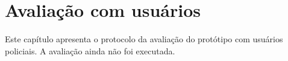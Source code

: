 \chapter{Avaliação com usuários}
\label{cap:avaliacao}

Este capítulo apresenta o protocolo da avaliação do protótipo com usuários
policiais. A avaliação ainda não foi executada.


